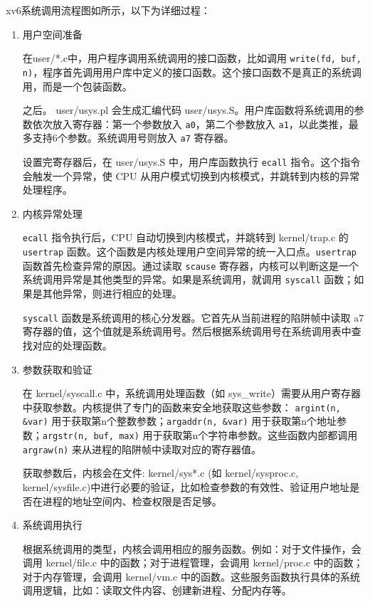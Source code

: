 xv6系统调用流程图如所示，以下为详细过程：
\begin{enumerate}
	\item 用户空间准备
	
	在user/*.c中，用户程序调用系统调用的接口函数，比如调用 \texttt{write(fd, buf, n)}，程序首先调用用户库中定义的接口函数。这个接口函数不是真正的系统调用，而是一个包装函数。
	
	之后。 user/usys.pl 会生成汇编代码 user/usys.S。用户库函数将系统调用的参数依次放入寄存器：第一个参数放入 \texttt{a0}，第二个参数放入 \texttt{a1}，以此类推，最多支持6个参数。系统调用号则放入 \texttt{a7} 寄存器。
	
	设置完寄存器后，在 user/usys.S 中，用户库函数执行 \texttt{ecall} 指令。这个指令会触发一个异常，使 CPU 从用户模式切换到内核模式，并跳转到内核的异常处理程序。
	
	\item 内核异常处理
	
	\texttt{ecall} 指令执行后，CPU 自动切换到内核模式，并跳转到 kernel/trap.c 的 \texttt{usertrap} 函数。这个函数是内核处理用户空间异常的统一入口点。\texttt{usertrap} 函数首先检查异常的原因。通过读取 \texttt{scause} 寄存器，内核可以判断这是一个系统调用异常是其他类型的异常。如果是系统调用，就调用 \texttt{syscall} 函数；如果是其他异常，则进行相应的处理。
	
	\texttt{syscall} 函数是系统调用的核心分发器。它首先从当前进程的陷阱帧中读取 a7 寄存器的值，这个值就是系统调用号。然后根据系统调用号在系统调用表中查找对应的处理函数。
	 
	\item 参数获取和验证
	
	在 kernel/syscall.c 中，系统调用处理函数（如 sys\_write）需要从用户寄存器中获取参数。内核提供了专门的函数来安全地获取这些参数：	\texttt{argint(n, \&var)} 用于获取第n个整数参数；\texttt{argaddr(n, \&var)} 用于获取第n个地址参数；\texttt{argstr(n, buf, max)} 用于获取第n个字符串参数。这些函数内部都调用 \texttt{argraw(n)} 来从进程的陷阱帧中读取对应的寄存器值。
	
	获取参数后，内核会在文件: kernel/sys*.c (如 kernel/sysproc.c, kernel/sysfile.c)中进行必要的验证，比如检查参数的有效性、验证用户地址是否在进程的地址空间内、检查权限是否足够。
	
	\item 系统调用执行
	
	根据系统调用的类型，内核会调用相应的服务函数。例如：对于文件操作，会调用 kernel/file.c 中的函数；对于进程管理，会调用 kernel/proc.c 中的函数；对于内存管理，会调用 kernel/vm.c 中的函数。这些服务函数执行具体的系统调用逻辑，比如：读取文件内容、创建新进程、分配内存等。
	

\end{enumerate}
